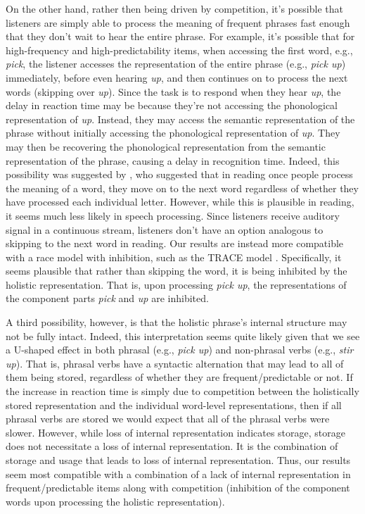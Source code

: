 \documentclass[
  authoryear,
  preprint,
  1p,
  onecolumn]{elsarticle}
\begin{document}
On the other hand, rather then being driven by competition, it's
possible that listeners are simply able to process the meaning of
frequent phrases fast enough that they don't wait to hear the entire
phrase. For example, it's possible that for high-frequency and
high-predictability items, when accessing the first word, e.g.,
\emph{pick}, the listener accesses the representation of the entire
phrase (e.g., \emph{pick up}) immediately, before even hearing
\emph{up}, and then continues on to process the next words (skipping
over \emph{up}). Since the task is to respond when they hear \emph{up},
the delay in reaction time may be because they're not accessing the
phonological representation of \emph{up}. Instead, they may access the
semantic representation of the phrase without initially accessing the
phonological representation of \emph{up}. They may then be recovering
the phonological representation from the semantic representation of the
phrase, causing a delay in recognition time. Indeed, this possibility
was suggested by \citet{healy1976}, who suggested that in reading once
people process the meaning of a word, they move on to the next word
regardless of whether they have processed each individual letter.
However, while this is plausible in reading, it seems much less likely
in speech processing. Since listeners receive auditory signal in a
continuous stream, listeners don't have an option analogous to skipping
to the next word in reading. Our results are instead more compatible
with a race model with inhibition, such as the TRACE model
\citep{mcclellandTRACEModelSpeech1984}. Specifically, it seems plausible
that rather than skipping the word, it is being inhibited by the
holistic representation. That is, upon processing \emph{pick up}, the
representations of the component parts \emph{pick} and \emph{up} are
inhibited.

A third possibility, however, is that the holistic phrase's internal
structure may not be fully intact. Indeed, this interpretation seems
quite likely given that we see a U-shaped effect in both phrasal (e.g.,
\emph{pick up}) and non-phrasal verbs (e.g., \emph{stir up}). That is,
phrasal verbs have a syntactic alternation that may lead to all of them
being stored, regardless of whether they are frequent/predictable or
not. If the increase in reaction time is simply due to competition
between the holistically stored representation and the individual
word-level representations, then if all phrasal verbs are stored we
would expect that all of the phrasal verbs were slower. However, while
loss of internal representation indicates storage, storage does not
necessitate a loss of internal representation. It is the combination of
storage and usage that leads to loss of internal representation. Thus,
our results seem most compatible with a combination of a lack of
internal representation in frequent/predictable items along with
competition (inhibition of the component words upon processing the
holistic representation).
\end{document}
